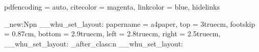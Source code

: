\AtEndPreamble
  {
    \RequirePackage { hyperref }
    \hypersetup 
      { 
        pdfencoding = auto,
        citecolor   = magenta,
        linkcolor   = blue,
        hidelinks
      }
  }




    
    
    



\cs_new:Npn \__whu_set_layout:
  {
    \setuplayout
      {
        papername = a4paper,
        top       = 3truecm,
        footskip  = 0.87cm,  %
        bottom    = 2.9truecm,
        left      = 2.8truecm,
        right     = 2.5truecm,
      }
  }
  { \__whu_set_layout: }
  { \whu_after_class:n { \__whu_set_layout: } }



